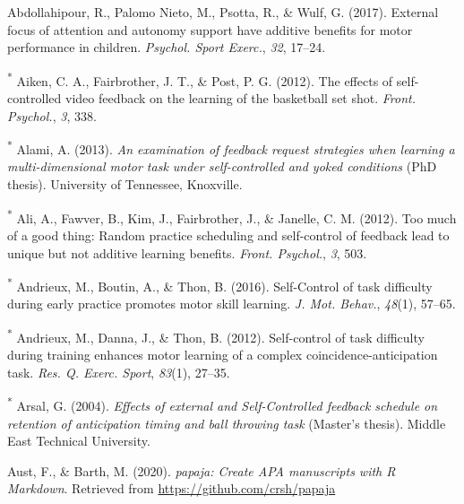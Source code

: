 \documentclass[
  english,
  man,floatsintext]{apa7}
\newlength{\cslhangindent}
\newlength{\cslentryspacingunit} %
\newenvironment{CSLReferences}[2] %
 {%
  \setlength{\parindent}{0pt}
  \ifodd #1
  \let\oldpar\par
  \def\par{\hangindent=\cslhangindent\oldpar}
  \fi
  \setlength{\parskip}{#2\cslentryspacingunit}
 }%
 {}
\begin{document}
\hypertarget{refs}{}
\begin{CSLReferences}{1}{0}
\leavevmode{}%
Abdollahipour, R., Palomo Nieto, M., Psotta, R., \& Wulf, G. (2017). External focus of attention and autonomy support have additive benefits for motor performance in children. \emph{Psychol. Sport Exerc.}, \emph{32}, 17--24.

\leavevmode{}%
\textsuperscript{*} Aiken, C. A., Fairbrother, J. T., \& Post, P. G. (2012). The effects of self-controlled video feedback on the learning of the basketball set shot. \emph{Front. Psychol.}, \emph{3}, 338.

\leavevmode{}%
\textsuperscript{*} Alami, A. (2013). \emph{An examination of feedback request strategies when learning a multi-dimensional motor task under self-controlled and yoked conditions} (PhD thesis). University of Tennessee, Knoxville.

\leavevmode{}%
\textsuperscript{*} Ali, A., Fawver, B., Kim, J., Fairbrother, J., \& Janelle, C. M. (2012). Too much of a good thing: Random practice scheduling and self-control of feedback lead to unique but not additive learning benefits. \emph{Front. Psychol.}, \emph{3}, 503.

\leavevmode{}%
\textsuperscript{*} Andrieux, M., Boutin, A., \& Thon, B. (2016). {Self-Control} of task difficulty during early practice promotes motor skill learning. \emph{J. Mot. Behav.}, \emph{48}(1), 57--65.

\leavevmode{}%
\textsuperscript{*} Andrieux, M., Danna, J., \& Thon, B. (2012). Self-control of task difficulty during training enhances motor learning of a complex coincidence-anticipation task. \emph{Res. Q. Exerc. Sport}, \emph{83}(1), 27--35.

\leavevmode{}%
\textsuperscript{*} Arsal, G. (2004). \emph{Effects of external and {Self-Controlled} feedback schedule on retention of anticipation timing and ball throwing task} (Master's thesis). Middle East Technical University.

\leavevmode{}%
Aust, F., \& Barth, M. (2020). \emph{{papaja}: {Create} {APA} manuscripts with {R Markdown}}. Retrieved from \url{https://github.com/crsh/papaja}


\end{CSLReferences}
\end{document}
